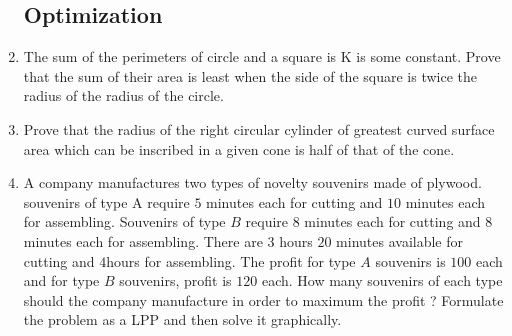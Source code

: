 \documentclass[12pt,-letter paper]{article}
\begin{document}
\begin{enumerate}
\subsection*{Optimization }
\item The sum of the perimeters of circle and a square is K is some constant. Prove that the sum of their area is least when the side of the square is twice the radius of the radius of the circle.  
\item Prove that the radius of the right circular cylinder of greatest curved surface area which can be inscribed in a given cone is half of that of the cone.
  \item A company manufactures two types of novelty souvenirs made of plywood. souvenirs of type A require $5$ minutes each for cutting and $10$ minutes each for assembling. Souvenirs of type $B$ require $8$ minutes each for cutting and $8$ minutes each for assembling. There are 3 hours $20$ minutes available for cutting and $4$hours for assembling. The profit for type $A$ souvenirs is \rupee$ 100$ each and for type $B$ souvenirs, profit is \rupee $120$ each. How many souvenirs of each type should the company manufacture in order to maximum the profit ? Formulate the problem as a LPP and then solve it graphically. 
\end{enumerate}
\end{document}

